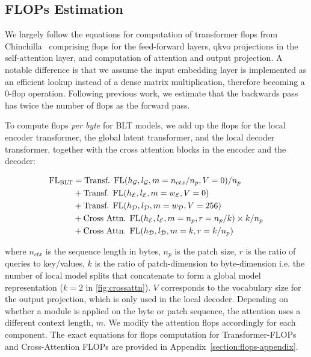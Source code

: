 \subsection{FLOPs Estimation} 
\label{section:flops}

We largely follow the equations for computation of transformer flops from Chinchilla~\citep{hoffmann2022training} comprising flops for the feed-forward layers, qkvo projections in the self-attention layer, and computation of attention and output projection. A notable difference is that we assume the input embedding layer is implemented as an efficient lookup instead of a dense matrix multiplication, therefore becoming a 0-flop operation. Following previous work, we estimate that the backwards pass has twice the number of flops as the forward pass.

To compute flops \textit{per byte} for {\textsc BLT} models, we add up the flops for the local encoder transformer, the global latent transformer, and the local decoder transformer, together with the cross attention blocks in the encoder and the decoder:

\begin{align}
    \text{FL}_{\text{{\textsc BLT}}} &= \text{Transf. FL}(h_{\mathcal{G}}, l_{\mathcal{G}}, m=n_{ctx}/n_p,V=0) / n_p\\
   &+\text{Transf. FL}(h_{\mathcal{E}}, l_{\mathcal{E}}, m=w_{\mathcal{E}}, V=0) \\
   &+ \text{Transf. FL}(h_{\mathcal{D}}, l_{\mathcal{D}}, m=w_{\mathcal{D}}, V=256) \\ 
    &+ \text{Cross Attn. FL}(h_{\mathcal{E}}, l_{\mathcal{E}}, m=n_p, r=n_p/k) \times k/n_p \\ 
   &+ \text{Cross Attn. FL}(h_{\mathcal{D}}, l_{\mathcal{D}}, m=k, r=k/n_p) 
\end{align}

where $n_{ctx}$ is the sequence length in bytes, $n_p$ is the patch size, $r$ is the ratio of queries to key/values, $k$ is the ratio of patch-dimension to byte-dimension i.e. the number of local model splits that concatenate to form a global model representation ($k=2$ in \autoref{fig:crossattn}). $V$ corresponds to the vocabulary size for the output projection, which is only used in the local decoder. Depending on whether a module is applied on the byte or patch sequence, the attention uses a different context length, $m$. We modify the attention flops accordingly for each component. The exact equations for flops computation for Transformer-FLOPs and Cross-Attention FLOPs are provided in Appendix~\ref{section:flops-appendix}.

